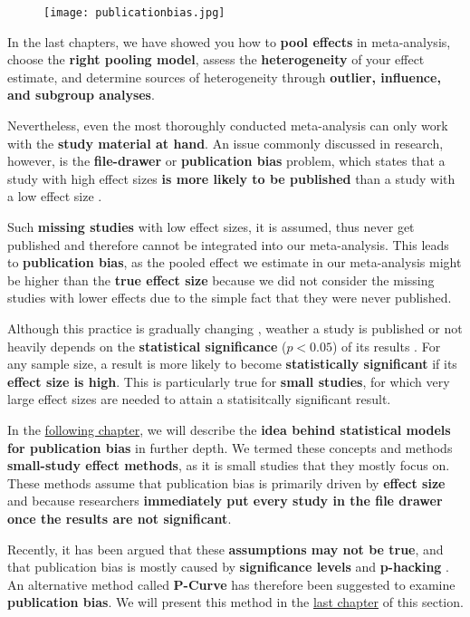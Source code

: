 \documentclass[]{book}
\theoremstyle{definition}
\theoremstyle{definition}
\theoremstyle{definition}
\theoremstyle{remark}
\begin{document}
\begin{figure}
\centering
\texttt{[image: publicationbias.jpg]}
\caption{}
\end{figure}

In the last chapters, we have showed you how to \textbf{pool effects} in
meta-analysis, choose the \textbf{right pooling model}, assess the
\textbf{heterogeneity} of your effect estimate, and determine sources of
heterogeneity through \textbf{outlier, influence, and subgroup
analyses}.

Nevertheless, even the most thoroughly conducted meta-analysis can only
work with the \textbf{study material at hand}. An issue commonly
discussed in research, however, is the \textbf{file-drawer} or
\textbf{publication bias} problem, which states that a study with high
effect sizes \textbf{is more likely to be published} than a study with a
low effect size \citep{rothstein2006publication}.

Such \textbf{missing studies} with low effect sizes, it is assumed, thus
never get published and therefore cannot be integrated into our
meta-analysis. This leads to \textbf{publication bias}, as the pooled
effect we estimate in our meta-analysis might be higher than the
\textbf{true effect size} because we did not consider the missing
studies with lower effects due to the simple fact that they were never
published.

Although this practice is gradually changing
\citep{nelson2018psychology}, weather a study is published or not
heavily depends on the \textbf{statistical significance} (\(p<0.05\)) of
its results \citep{dickersin2005publication}. For any sample size, a
result is more likely to become \textbf{statistically significant} if
its \textbf{effect size is high}. This is particularly true for
\textbf{small studies}, for which very large effect sizes are needed to
attain a statisitcally significant result.

In the \protect\hyperlink{smallstudyeffects}{following chapter}, we will
describe the \textbf{idea behind statistical models for publication
bias} in further depth. We termed these concepts and methods
\textbf{small-study effect methods}, as it is small studies that they
mostly focus on. These methods assume that publication bias is primarily
driven by \textbf{effect size} and because researchers
\textbf{immediately put every study in the file drawer once the results
are not significant}.

Recently, it has been argued that these \textbf{assumptions may not be
true}, and that publication bias is mostly caused by
\textbf{significance levels} and \textbf{p-hacking}
\citep{simonsohn2014p}. An alternative method called \textbf{P-Curve}
has therefore been suggested to examine \textbf{publication bias}. We
will present this method in the \protect\hyperlink{pcurve}{last chapter}
of this section.
\end{document}
